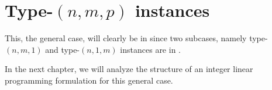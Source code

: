\section{Type-$(n, m, p)$ instances}

This, the general case, will clearly be in \nph since two subcases, namely type-$(n, m, 1)$ and type-$(n, 1, m)$ instances are in \nph.

In the next chapter, we will analyze the structure of an integer linear programming formulation for this general case.
